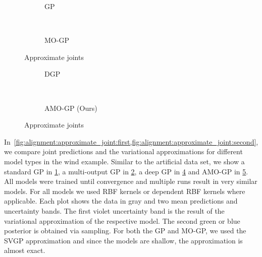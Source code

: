 \begin{figure}[p]
    \begin{subfigure}[b]{\linewidth}
        \centering
        \caption{
            \label{fig:alignment:approximate_joint:gp}
            GP
        }
    \end{subfigure}\\[\figureskip]
    \begin{subfigure}[b]{\linewidth}
        \centering
        \caption{
            \label{fig:alignment:approximate_joint:mo_gp}
            MO-GP
        }
    \end{subfigure}
    \caption{
        \label{fig:alignment:approximate_joint:first}
        Approximate joints
    }
\end{figure}
\begin{figure}[p]
    \begin{subfigure}[b]{\linewidth}
        \centering
        \caption{
            \label{fig:alignment:approximate_joint:dgp}
            DGP
        }
    \end{subfigure}\\[\figureskip]
    \begin{subfigure}[b]{\linewidth}
        \centering
        \caption{
            \label{fig:alignment:approximate_joint:ours}
            AMO-GP (Ours)
        }
    \end{subfigure}
    \caption{
        \label{fig:alignment:approximate_joint:second}
        Approximate joints
    }
\end{figure}
In~\cref{fig:alignment:approximate_joint:first,fig:alignment:approximate_joint:second}, we compare joint predictions and the variational approximations for different model types in the wind example.
Similar to the artificial data set, we show a standard GP in \cref{fig:alignment:approximate_joint:gp}, a multi-output GP in \cref{fig:alignment:approximate_joint:mo_gp}, a deep GP in \cref{fig:alignment:approximate_joint:dgp} and AMO-GP in \cref{fig:alignment:approximate_joint:ours}.
All models were trained until convergence and multiple runs result in very similar models.
For all models we used RBF kernels or dependent RBF kernels where applicable.
Each plot shows the data in gray and two mean predictions and uncertainty bands.
The first violet uncertainty band is the result of the variational approximation of the respective model.
The second green or blue posterior is obtained via sampling.
For both the GP and MO-GP, we used the SVGP approximation and since the models are shallow, the approximation is almost exact.

